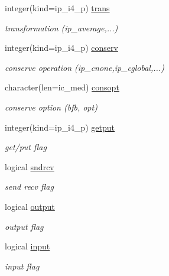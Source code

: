 \begin{DoxyCompactItemize}
integer(kind=ip\+\_\+i4\+\_\+p) \hyperlink{structmod__oasis__coupler_1_1prism__coupler__type_ad9fad1fec923d4db974f94fd0bca5697}{trans}
\begin{DoxyCompactList}\small\item\em transformation (ip\+\_\+average,...) \end{DoxyCompactList}\item 
integer(kind=ip\+\_\+i4\+\_\+p) \hyperlink{structmod__oasis__coupler_1_1prism__coupler__type_a6ae875acb2785153668c3e773ed9682f}{conserv}
\begin{DoxyCompactList}\small\item\em conserve operation (ip\+\_\+cnone,ip\+\_\+cglobal,...) \end{DoxyCompactList}\item 
character(len=ic\+\_\+med) \hyperlink{structmod__oasis__coupler_1_1prism__coupler__type_ab539821ab680aa56c81cb541c093f50f}{consopt}
\begin{DoxyCompactList}\small\item\em conserve option (bfb, opt) \end{DoxyCompactList}\item 
integer(kind=ip\+\_\+i4\+\_\+p) \hyperlink{structmod__oasis__coupler_1_1prism__coupler__type_a72f8ada57213a9c0e6ab85742c521f86}{getput}
\begin{DoxyCompactList}\small\item\em get/put flag \end{DoxyCompactList}\item 
logical \hyperlink{structmod__oasis__coupler_1_1prism__coupler__type_a45db2da67a23b8a4b693d0b7882996b5}{sndrcv}
\begin{DoxyCompactList}\small\item\em send recv flag \end{DoxyCompactList}\item 
logical \hyperlink{structmod__oasis__coupler_1_1prism__coupler__type_a56fc19e4619dd8224859f222566ea7ca}{output}
\begin{DoxyCompactList}\small\item\em output flag \end{DoxyCompactList}\item 
logical \hyperlink{structmod__oasis__coupler_1_1prism__coupler__type_a1cda09cced2782af8cdccae35a00107d}{input}
\begin{DoxyCompactList}\small\item\em input flag \end{DoxyCompactList}\item 

\end{DoxyCompactItemize}
